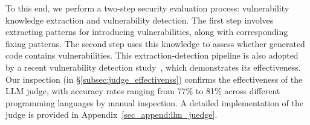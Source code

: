 To this end, we perform a two-step security evaluation process: vulnerability knowledge extraction and vulnerability detection. The first step involves extracting patterns for introducing vulnerabilities, along with corresponding fixing patterns. The second step uses this knowledge to assess whether generated code contains vulnerabilities. This extraction-detection pipeline is also adopted by a recent vulnerability detection study~\cite{du2024vul}, which demonstrates its effectiveness. Our inspection (in \S\ref{subsec:judge_effectivenss}) confirms the effectiveness of the LLM judge, with accuracy rates ranging from 77\% to 81\% across different programming languages by manual inspection. A detailed implementation of the judge is provided in Appendix~\ref{sec_append:llm_juedge}.
